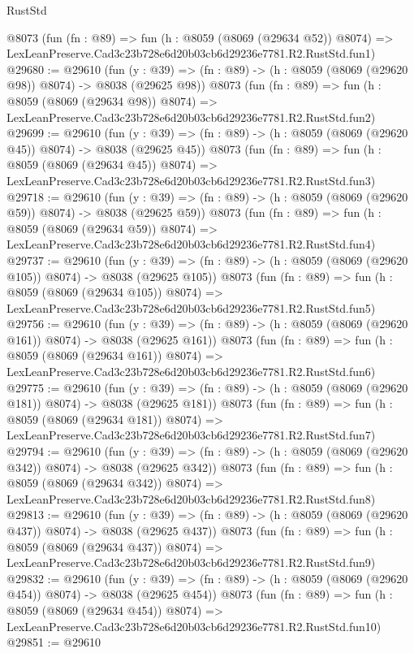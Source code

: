 \begin{lexlean}{RustStd}
\begin{coremodule}
    @8073
    (fun (fn : @89) =>
    fun (h : @8059 (@8069 (@29634 @52)) @8074) =>
    LexLeanPreserve.Cad3c23b728e6d20b03cb6d29236e7781.R2.RustStd.fun1)
@29680 := @29610
    (fun (y : @39) => (fn : @89) -> (h : @8059 (@8069 (@29620 @98)) @8074) -> @8038 (@29625 @98))
    @8073
    (fun (fn : @89) =>
    fun (h : @8059 (@8069 (@29634 @98)) @8074) =>
    LexLeanPreserve.Cad3c23b728e6d20b03cb6d29236e7781.R2.RustStd.fun2)
@29699 := @29610
    (fun (y : @39) => (fn : @89) -> (h : @8059 (@8069 (@29620 @45)) @8074) -> @8038 (@29625 @45))
    @8073
    (fun (fn : @89) =>
    fun (h : @8059 (@8069 (@29634 @45)) @8074) =>
    LexLeanPreserve.Cad3c23b728e6d20b03cb6d29236e7781.R2.RustStd.fun3)
@29718 := @29610
    (fun (y : @39) => (fn : @89) -> (h : @8059 (@8069 (@29620 @59)) @8074) -> @8038 (@29625 @59))
    @8073
    (fun (fn : @89) =>
    fun (h : @8059 (@8069 (@29634 @59)) @8074) =>
    LexLeanPreserve.Cad3c23b728e6d20b03cb6d29236e7781.R2.RustStd.fun4)
@29737 := @29610
    (fun (y : @39) => (fn : @89) -> (h : @8059 (@8069 (@29620 @105)) @8074) -> @8038 (@29625 @105))
    @8073
    (fun (fn : @89) =>
    fun (h : @8059 (@8069 (@29634 @105)) @8074) =>
    LexLeanPreserve.Cad3c23b728e6d20b03cb6d29236e7781.R2.RustStd.fun5)
@29756 := @29610
    (fun (y : @39) => (fn : @89) -> (h : @8059 (@8069 (@29620 @161)) @8074) -> @8038 (@29625 @161))
    @8073
    (fun (fn : @89) =>
    fun (h : @8059 (@8069 (@29634 @161)) @8074) =>
    LexLeanPreserve.Cad3c23b728e6d20b03cb6d29236e7781.R2.RustStd.fun6)
@29775 := @29610
    (fun (y : @39) => (fn : @89) -> (h : @8059 (@8069 (@29620 @181)) @8074) -> @8038 (@29625 @181))
    @8073
    (fun (fn : @89) =>
    fun (h : @8059 (@8069 (@29634 @181)) @8074) =>
    LexLeanPreserve.Cad3c23b728e6d20b03cb6d29236e7781.R2.RustStd.fun7)
@29794 := @29610
    (fun (y : @39) => (fn : @89) -> (h : @8059 (@8069 (@29620 @342)) @8074) -> @8038 (@29625 @342))
    @8073
    (fun (fn : @89) =>
    fun (h : @8059 (@8069 (@29634 @342)) @8074) =>
    LexLeanPreserve.Cad3c23b728e6d20b03cb6d29236e7781.R2.RustStd.fun8)
@29813 := @29610
    (fun (y : @39) => (fn : @89) -> (h : @8059 (@8069 (@29620 @437)) @8074) -> @8038 (@29625 @437))
    @8073
    (fun (fn : @89) =>
    fun (h : @8059 (@8069 (@29634 @437)) @8074) =>
    LexLeanPreserve.Cad3c23b728e6d20b03cb6d29236e7781.R2.RustStd.fun9)
@29832 := @29610
    (fun (y : @39) => (fn : @89) -> (h : @8059 (@8069 (@29620 @454)) @8074) -> @8038 (@29625 @454))
    @8073
    (fun (fn : @89) =>
    fun (h : @8059 (@8069 (@29634 @454)) @8074) =>
    LexLeanPreserve.Cad3c23b728e6d20b03cb6d29236e7781.R2.RustStd.fun10)
@29851 := @29610

\end{coremodule}
\end{lexlean}
